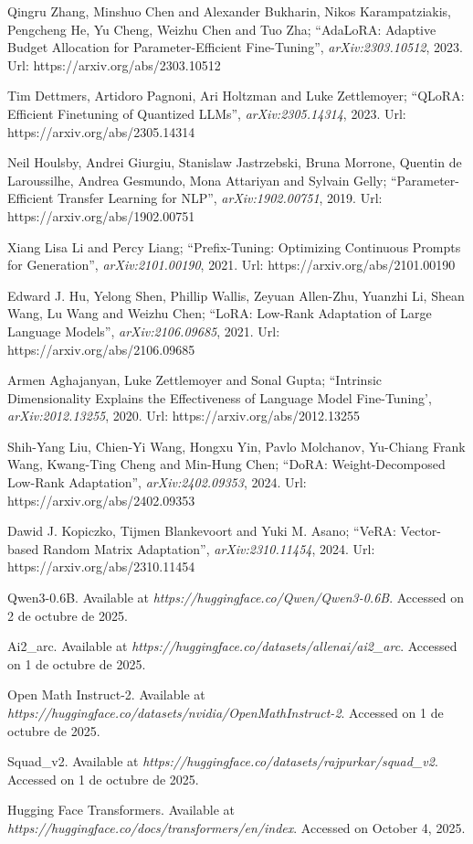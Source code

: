 \documentclass[11pt,a4paper]{article}
\begin{document}
\begin{thebibliography}{99}

 Qingru Zhang, Minshuo Chen and Alexander Bukharin, Nikos Karampatziakis, Pengcheng He, Yu Cheng, Weizhu Chen and Tuo Zha; ``AdaLoRA: Adaptive Budget Allocation for Parameter-Efficient Fine-Tuning'', {\it arXiv:2303.10512}, 2023. Url: https://arxiv.org/abs/2303.10512

 Tim Dettmers, Artidoro Pagnoni, Ari Holtzman and Luke Zettlemoyer; ``QLoRA: Efficient Finetuning of Quantized LLMs'', {\it arXiv:2305.14314}, 2023. Url: https://arxiv.org/abs/2305.14314

 Neil Houlsby, Andrei Giurgiu, Stanislaw Jastrzebski, Bruna Morrone, Quentin de Laroussilhe, Andrea Gesmundo, Mona Attariyan and Sylvain Gelly; ``Parameter-Efficient Transfer Learning for NLP'', {\it arXiv:1902.00751}, 2019. Url: https://arxiv.org/abs/1902.00751

 Xiang Lisa Li and Percy Liang; ``Prefix-Tuning: Optimizing Continuous Prompts for Generation'', {\it arXiv:2101.00190}, 2021. Url: https://arxiv.org/abs/2101.00190

 Edward J. Hu, Yelong Shen, Phillip Wallis, Zeyuan Allen-Zhu, Yuanzhi Li, Shean Wang, Lu Wang and Weizhu Chen; ``LoRA: Low-Rank Adaptation of Large Language Models'', {\it arXiv:2106.09685}, 2021. Url: https://arxiv.org/abs/2106.09685

 Armen Aghajanyan, Luke Zettlemoyer and Sonal Gupta; ``Intrinsic Dimensionality Explains the Effectiveness of Language Model Fine-Tuning', {\it arXiv:2012.13255}, 2020. Url: https://arxiv.org/abs/2012.13255

 Shih-Yang Liu, Chien-Yi Wang, Hongxu Yin, Pavlo Molchanov, Yu-Chiang Frank Wang, Kwang-Ting Cheng and Min-Hung Chen; ``DoRA: Weight-Decomposed Low-Rank Adaptation'', {\it arXiv:2402.09353}, 2024. Url: https://arxiv.org/abs/2402.09353

 Dawid J. Kopiczko, Tijmen Blankevoort and Yuki M. Asano; ``VeRA: Vector-based Random Matrix Adaptation'', {\it arXiv:2310.11454}, 2024. Url: https://arxiv.org/abs/2310.11454

 Qwen3-0.6B. Available at {\it https://huggingface.co/Qwen/Qwen3-0.6B}. Accessed on 2 de octubre de 2025.

 Ai2\_arc. Available at {\it https://huggingface.co/datasets/allenai/ai2\_arc}. Accessed on 1 de octubre de 2025.

 Open Math Instruct-2. Available at {\it https://huggingface.co/datasets/nvidia/OpenMathInstruct-2}. Accessed on 1 de octubre de 2025.

 Squad\_v2. Available at {\it https://huggingface.co/datasets/rajpurkar/squad\_v2}. Accessed on 1 de octubre de 2025.

 Hugging Face Transformers. Available at {\it https://huggingface.co/docs/transformers/en/index}. Accessed on October 4, 2025.

\end{thebibliography}
\end{document}
